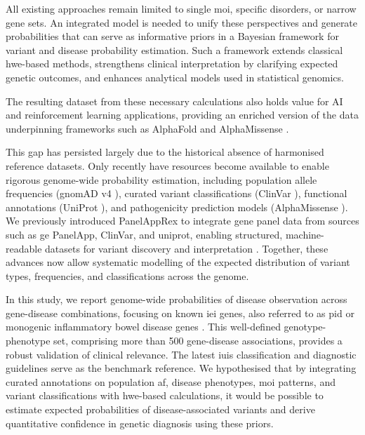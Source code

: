 All existing approaches remain limited to single \ac{moi}, specific disorders, or narrow gene sets. An integrated model is needed to unify these perspectives and generate probabilities that can serve as informative priors in a Bayesian framework for variant and disease probability estimation. Such a framework extends classical \ac{hwe}-based methods, strengthens clinical interpretation by clarifying expected genetic outcomes, and enhances analytical models used in statistical genomics.

The resulting dataset from these necessary calculations also holds value for AI and reinforcement learning applications, providing an enriched version of the data underpinning frameworks such as AlphaFold \cite{jumper_highly_2021} and AlphaMissense \cite{cheng_accurate_2023}.

This gap has persisted largely due to the historical absence of harmonised reference datasets. Only recently have resources become available to enable rigorous genome-wide probability estimation, including population allele frequencies (gnomAD v4 \cite{karczewski2020mutational}), curated variant classifications (ClinVar \cite{landrum_clinvar_2018}), functional annotations (UniProt \cite{the_uniprot_consortium_uniprot_2025}), and pathogenicity prediction models (AlphaMissense \cite{cheng_accurate_2023}). We previously introduced PanelAppRex to integrate gene panel data from sources such as \ac{ge} PanelApp, ClinVar, and \ac{uniprot}, enabling structured, machine-readable datasets for variant discovery and interpretation \cite{lawless_panelapprex_2025, martin_panelapp_2019, landrum_clinvar_2018, the_uniprot_consortium_uniprot_2025}. Together, these advances now allow systematic modelling of the expected distribution of variant types, frequencies, and classifications across the genome.

In this study, we report genome-wide probabilities of disease observation across gene-disease combinations, focusing on known \ac{iei} genes, also referred to as \ac{pid} or monogenic inflammatory bowel disease genes \cite{poli_human_2025, lawless_panelapprex_2025, martin_panelapp_2019}. This well-defined genotype-phenotype set, comprising more than 500 gene-disease associations, provides a robust validation of clinical relevance. The latest \ac{iuis} classification and diagnostic guidelines \cite{poli_human_2025, bousfiha_2024_2025} serve as the benchmark reference. We hypothesised that by integrating curated annotations on population \ac{af}, disease phenotypes, \ac{moi} patterns, and variant classifications with \ac{hwe}-based calculations, it would be possible to estimate expected probabilities of disease-associated variants and derive quantitative confidence in genetic diagnosis using these priors.

